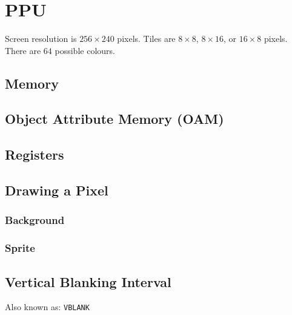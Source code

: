 \chapter{PPU}

Screen resolution is $256 \times 240$ pixels.
Tiles are $8 \times 8$, $8 \times 16$, or $16 \times 8$ pixels.
There are $64$ possible colours.

\section{Memory}

\section{Object Attribute Memory (OAM)}

\section{Registers}

\section{Drawing a Pixel}

\subsection{Background}

\subsection{Sprite}

\section{Vertical Blanking Interval}

Also known as: \texttt{VBLANK}
